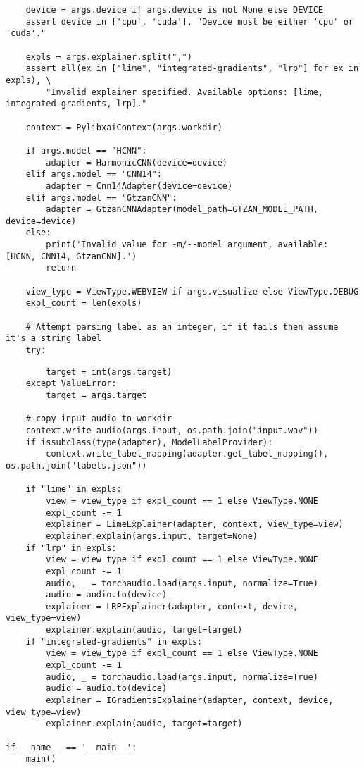 \documentclass[
    bindingoffset=5mm,  %
    footnoteindent=3mm, %
    hyphenation=true    %
]{src/wut-thesis}
\begin{document}
\begin{verbatim}
    device = args.device if args.device is not None else DEVICE
    assert device in ['cpu', 'cuda'], "Device must be either 'cpu' or 'cuda'."
    
    expls = args.explainer.split(",")
    assert all(ex in ["lime", "integrated-gradients", "lrp"] for ex in expls), \
        "Invalid explainer specified. Available options: [lime, integrated-gradients, lrp]."

    context = PylibxaiContext(args.workdir)

    if args.model == "HCNN":
        adapter = HarmonicCNN(device=device)
    elif args.model == "CNN14":
        adapter = Cnn14Adapter(device=device)
    elif args.model == "GtzanCNN":
        adapter = GtzanCNNAdapter(model_path=GTZAN_MODEL_PATH, device=device)
    else:
        print('Invalid value for -m/--model argument, available: [HCNN, CNN14, GtzanCNN].')
        return
    
    view_type = ViewType.WEBVIEW if args.visualize else ViewType.DEBUG
    expl_count = len(expls)

    # Attempt parsing label as an integer, if it fails then assume it's a string label
    try:
\end{verbatim}
\begin{verbatim}
        target = int(args.target)
    except ValueError:
        target = args.target

    # copy input audio to workdir
    context.write_audio(args.input, os.path.join("input.wav"))
    if issubclass(type(adapter), ModelLabelProvider):
        context.write_label_mapping(adapter.get_label_mapping(), os.path.join("labels.json"))
    
    if "lime" in expls:
        view = view_type if expl_count == 1 else ViewType.NONE
        expl_count -= 1
        explainer = LimeExplainer(adapter, context, view_type=view)
        explainer.explain(args.input, target=None)
    if "lrp" in expls:
        view = view_type if expl_count == 1 else ViewType.NONE
        expl_count -= 1
        audio, _ = torchaudio.load(args.input, normalize=True)
        audio = audio.to(device)
        explainer = LRPExplainer(adapter, context, device, view_type=view)
        explainer.explain(audio, target=target)
    if "integrated-gradients" in expls:
        view = view_type if expl_count == 1 else ViewType.NONE
        expl_count -= 1
        audio, _ = torchaudio.load(args.input, normalize=True)
        audio = audio.to(device)
        explainer = IGradientsExplainer(adapter, context, device, view_type=view)
        explainer.explain(audio, target=target)

if __name__ == '__main__':
    main()
\end{verbatim}
\end{document}
